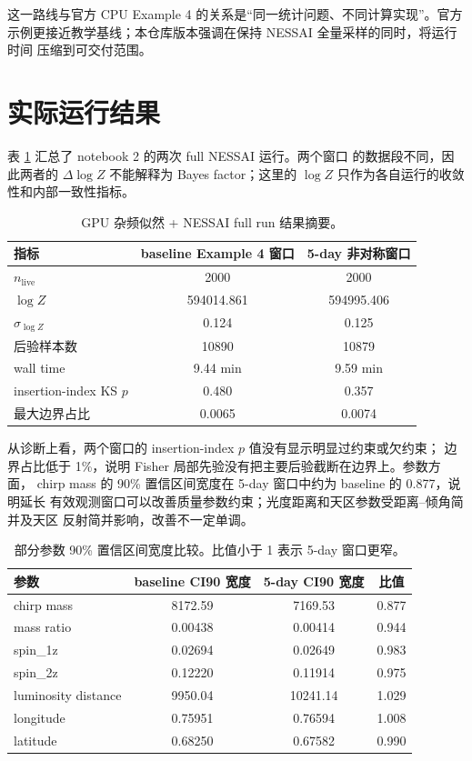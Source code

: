 \documentclass[11pt,a4paper]{ctexart}
\begin{document}
这一路线与官方 CPU Example 4 的关系是“同一统计问题、不同计算实现”。官方
示例更接近教学基线；本仓库版本强调在保持 NESSAI 全量采样的同时，将运行时间
压缩到可交付范围。

\section{实际运行结果}

表 \ref{tab:nessai-summary} 汇总了 notebook 2 的两次 full NESSAI 运行。两个窗口
的数据段不同，因此两者的 \(\Delta \log Z\) 不能解释为 Bayes factor；这里的
\(\log Z\) 只作为各自运行的收敛性和内部一致性指标。

\begin{table}[H]
  \centering
  \caption{GPU 杂频似然 + NESSAI full run 结果摘要。}
  \label{tab:nessai-summary}
  \begin{tabular}{lcc}
    \toprule
    指标 & baseline Example 4 窗口 & 5-day 非对称窗口 \\
    \midrule
    \(n_\mathrm{live}\) & 2000 & 2000 \\
    \(\log Z\) & 594014.861 & 594995.406 \\
    \(\sigma_{\log Z}\) & 0.124 & 0.125 \\
    后验样本数 & 10890 & 10879 \\
    wall time & 9.44 min & 9.59 min \\
    insertion-index KS \(p\) & 0.480 & 0.357 \\
    最大边界占比 & 0.0065 & 0.0074 \\
    \bottomrule
  \end{tabular}
\end{table}

从诊断上看，两个窗口的 insertion-index \(p\) 值没有显示明显过约束或欠约束；
边界占比低于 1\%，说明 Fisher 局部先验没有把主要后验截断在边界上。参数方面，
chirp mass 的 90\% 置信区间宽度在 5-day 窗口中约为 baseline 的 0.877，说明延长
有效观测窗口可以改善质量参数约束；光度距离和天区参数受距离--倾角简并及天区
反射简并影响，改善不一定单调。

\begin{table}[H]
  \centering
  \caption{部分参数 90\% 置信区间宽度比较。比值小于 1 表示 5-day 窗口更窄。}
  \label{tab:ci-summary}
  \begin{tabular}{lccc}
    \toprule
    参数 & baseline CI90 宽度 & 5-day CI90 宽度 & 比值 \\
    \midrule
    chirp mass & 8172.59 & 7169.53 & 0.877 \\
    mass ratio & 0.00438 & 0.00414 & 0.944 \\
    spin\_1z & 0.02694 & 0.02649 & 0.983 \\
    spin\_2z & 0.12220 & 0.11914 & 0.975 \\
    luminosity distance & 9950.04 & 10241.14 & 1.029 \\
    longitude & 0.75951 & 0.76594 & 1.008 \\
    latitude & 0.68250 & 0.67582 & 0.990 \\
    \bottomrule
  \end{tabular}
\end{table}
\end{document}
